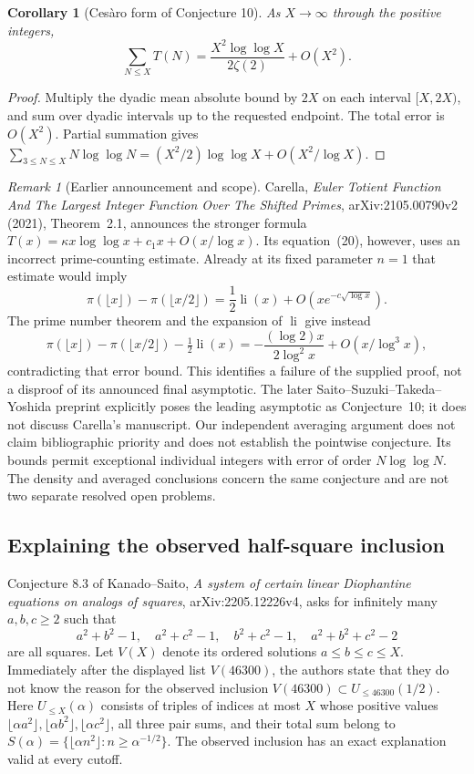 \documentclass[11pt,a4paper]{article}
\newtheorem{corollary}[theorem]{Corollary}
\theoremstyle{definition}
\theoremstyle{remark}
\newtheorem{remark}[theorem]{Remark}
\numberwithin{equation}{section}
\begin{document}
\begin{corollary}[Ces\`aro form of Conjecture 10]
\label{f13:cor:quotient-cesaro}
As $X\to\infty$ through the positive integers,
\[
 \sum_{N\leq X}T(N)
 =\frac{X^2\log\log X}{2\zeta(2)}+O(X^2).
\]
\end{corollary}

\begin{proof}
Multiply the dyadic mean absolute bound by $2X$ on each interval
$[X,2X)$, and sum over dyadic intervals up to the requested endpoint.
The total error is $O(X^2)$. Partial summation gives
$\sum_{3\leq N\leq X}N\log\log N=(X^2/2)\log\log X+O(X^2/\log X)$.
\end{proof}

\begin{remark}[Earlier announcement and scope]
Carella, \emph{Euler Totient Function And The Largest Integer Function
Over The Shifted Primes}, arXiv:2105.00790v2 (2021), Theorem~2.1,
announces the stronger formula
$T(x)=\kappa x\log\log x+c_1x+O(x/\log x)$.
Its equation~(20), however, uses an incorrect prime-counting estimate.
Already at its fixed parameter $n=1$ that estimate would imply
\[
 \pi(\lfloor x\rfloor)-\pi(\lfloor x/2\rfloor)
 =\frac12\operatorname{li}(x)+O(xe^{-c\sqrt{\log x}}).
\]
The prime number theorem and the expansion of $\operatorname{li}$ give
instead
\[
 \pi(\lfloor x\rfloor)-\pi(\lfloor x/2\rfloor)
 -\tfrac12\operatorname{li}(x)
 =-\frac{(\log2)x}{2\log^2x}+O(x/\log^3x),
\]
contradicting that error bound. This identifies a failure of the supplied
proof, not a disproof of its announced final asymptotic. The later
Saito--Suzuki--Takeda--Yoshida preprint explicitly poses the leading
asymptotic as Conjecture~10; it does not discuss Carella's manuscript.
Our independent averaging argument does not claim bibliographic
priority and does not establish the pointwise conjecture. Its bounds
permit exceptional individual integers with error of order
$N\log\log N$. The density and averaged conclusions concern the same
conjecture and are not two separate resolved open problems.
\end{remark}

\subsection{Explaining the observed half-square inclusion}

Conjecture 8.3 of Kanado--Saito, \emph{A system of certain linear
Diophantine equations on analogs of squares}, arXiv:2205.12226v4,
asks for infinitely many $a,b,c\geq2$ such that
\[
 a^2+b^2-1,\quad a^2+c^2-1,\quad b^2+c^2-1,\quad
 a^2+b^2+c^2-2
\]
are all squares. Let $V(X)$ denote its ordered solutions
$a\leq b\leq c\leq X$. Immediately after the displayed list $V(46300)$,
the authors state that they do not know the reason for the observed
inclusion $V(46300)\subset U_{\leq46300}(1/2)$. Here
$U_{\leq X}(\alpha)$ consists of triples of indices at most $X$ whose
positive values $\lfloor\alpha a^2\rfloor,\lfloor\alpha b^2\rfloor,
\lfloor\alpha c^2\rfloor$, all three pair sums, and their total sum
belong to $S(\alpha)=\{\lfloor\alpha n^2\rfloor:n\geq\alpha^{-1/2}\}$.
The observed inclusion has an exact explanation valid at every cutoff.
\end{document}
